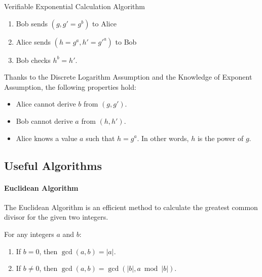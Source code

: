 \documentclass{article}
\begin{document}
\begin{protocol}{Verifiable Exponential Calculation Algorithm}{}
    \begin{enumerate}
    \item Bob sends $(g, g'=g^{b})$ to Alice
    \item Alice sends $(h=g^{a}, h'=g'^{a})$ to Bob
    \item Bob checks $h^{b} = h'$.
\end{enumerate}
\end{protocol}

Thanks to the Discrete Logarithm Assumption and the Knowledge of Exponent Assumption, the following properties hold:
\begin{itemize}
\item Alice cannot derive $b$ from $(g, g')$.
\item Bob cannot derive $a$ from $(h, h')$.
\item Alice knows a value $a$ such that $h = g^a$. In other words, $h$ is the power of $g$.
\end{itemize}

\subsection{Useful Algorithms}

\paragraph{Euclidean Algorithm}

The Euclidean Algorithm is an efficient method to calculate the greatest common divisor for the given two integers.

\begin{theorem}{}{}
For any integers $a$ and $b$:
\begin{enumerate}
\item If $b = 0$, then $\gcd(a, b) = |a|$.
\item If $b \neq 0$, then $\gcd(a, b) = \gcd(|b|, a \bmod |b|)$.
\end{enumerate}
\end{theorem}
\end{document}

